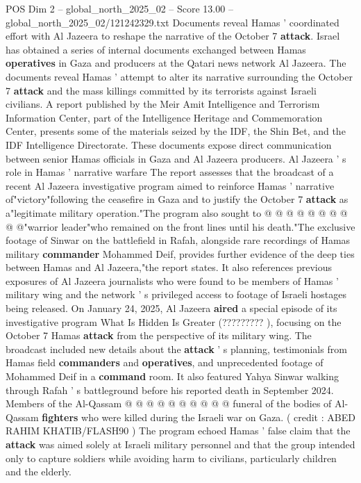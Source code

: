 \begin{textsample}{POS Dim 2 – global\_north\_2025\_02 – Score 13.00 – global\_north\_2025\_02/121242329.txt}  \label{ex:f2_pos_435}
Documents reveal Hamas ' coordinated effort with Al Jazeera to reshape the narrative of the October 7 \textbf{attack}.
Israel has obtained a series of internal documents exchanged between Hamas \textbf{operatives} in Gaza and producers at the Qatari news network Al Jazeera.
The documents reveal Hamas ' attempt to alter its narrative surrounding the October 7 \textbf{attack} and the mass killings committed by its terrorists against Israeli civilians.
A report published by the Meir Amit Intelligence and Terrorism Information Center, part of the Intelligence Heritage and Commemoration Center, presents some of the materials seized by the IDF, the Shin Bet, and the IDF Intelligence Directorate.
These documents expose direct communication between senior Hamas officials in Gaza and Al Jazeera producers.
Al Jazeera ' s role in Hamas ' narrative warfare The report assesses that the broadcast of a recent Al Jazeera investigative program aimed to reinforce Hamas ' narrative of"victory"following the ceasefire in Gaza and to justify the October 7 \textbf{attack} as a"legitimate military operation."The program also sought to @ @ @ @ @ @ @ @ @ @"warrior leader"who remained on the front lines until his death."The exclusive footage of Sinwar on the battlefield in Rafah, alongside rare recordings of Hamas military \textbf{commander} Mohammed Deif, provides further evidence of the deep ties between Hamas and Al Jazeera,"the report states.
It also references previous exposures of Al Jazeera journalists who were found to be members of Hamas ' military wing and the network ' s privileged access to footage of Israeli hostages being released.
On January 24, 2025, Al Jazeera \textbf{aired} a special episode of its investigative program What Is Hidden Is Greater (????????? ), focusing on the October 7 Hamas \textbf{attack} from the perspective of its military wing.
The broadcast included new details about the \textbf{attack} ' s planning, testimonials from Hamas field \textbf{commanders} and \textbf{operatives}, and unprecedented footage of Mohammed Deif in a \textbf{command} room.
It also featured Yahya Sinwar walking through Rafah ' s battleground before his reported death in September 2024.
Members of the Al-Qassam @ @ @ @ @ @ @ @ @ @ funeral of the bodies of Al-Qassam \textbf{fighters} who were killed during the Israeli war on Gaza. ( credit : ABED RAHIM KHATIB/FLASH90 ) The program echoed Hamas ' false claim that the \textbf{attack} was aimed solely at Israeli military personnel and that the group intended only to capture soldiers while avoiding harm to civilians, particularly children and the elderly.

\end{textsample}
